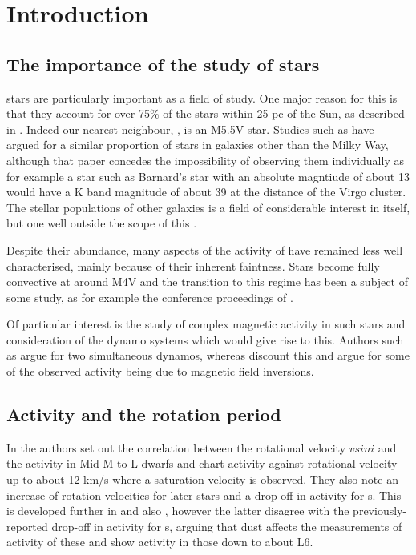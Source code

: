 \chapter{Introduction}
\protect\label{chapter:introduction}

\section{The importance of the study of {\rdwarf} stars}
\protect\label{section:introrwarfs}

{\rdwarf} stars are particularly important as a field of study. One major reason for this is that they account for over
75\% of the stars within 25 pc of the Sun, as described in \citet{winters15}. Indeed our nearest neighbour, \prox, is an
M5.5V star. Studies such as \citet{vandokkum2010} have argued for a similar proportion of {\rdwarf} stars in galaxies
other than the Milky Way, although that paper concedes the impossibility of observing them individually as for example a
star such as Barnard's star with an absolute magntiude of about 13 would have a K band magnitude of about 39 at the
distance of the Virgo cluster. The stellar populations of other galaxies is a field of considerable interest in itself,
but one well outside the scope of this \paperorthesis.

Despite their abundance, many aspects of the activity of {\rdwarf} have remained less well characterised, mainly because
of their inherent faintness. Stars become fully convective at around M4V and the transition to this regime has been a
subject of some study, as for example the conference proceedings of \citet{stassun11}.

Of particular interest is the study of complex magnetic activity in such stars and consideration of the dynamo systems
which would give rise to this. Authors such as \citet{morin11} argue for two simultaneous dynamos, whereas
\citet{kitchatinov14} discount this and argue for some of the observed activity being due to magnetic field inversions.

\section{Activity and the rotation period}
\protect\label{section:introrotation}

In \citet{mohanty03} the authors set out the correlation between the rotational velocity $ v sin i $ and the activity in
Mid-M to L-dwarfs and chart activity against rotational velocity up to about 12 km/s where a saturation velocity is
observed. They also note an increase of rotation velocities for later stars and a drop-off in activity for
\ldwarf s. This is developed further in \citet{reiners08} and also \citet{schmidt14}, however the latter disagree with
the previously-reported drop-off in activity for \ldwarf s, arguing that dust affects the measurements of activity of
these and show activity in those down to about L6.

